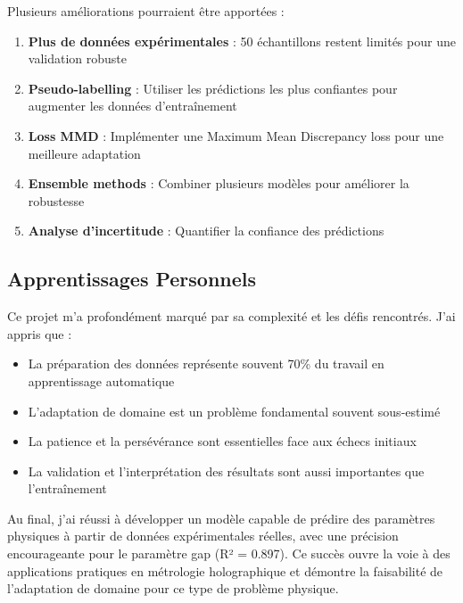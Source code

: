 \documentclass[11pt,a4paper]{article}
\begin{document}
Plusieurs améliorations pourraient être apportées :

\begin{enumerate}
    \item \textbf{Plus de données expérimentales} : 50 échantillons restent limités pour une validation robuste
    \item \textbf{Pseudo-labelling} : Utiliser les prédictions les plus confiantes pour augmenter les données d'entraînement
    \item \textbf{Loss MMD} : Implémenter une Maximum Mean Discrepancy loss pour une meilleure adaptation
    \item \textbf{Ensemble methods} : Combiner plusieurs modèles pour améliorer la robustesse
    \item \textbf{Analyse d'incertitude} : Quantifier la confiance des prédictions
\end{enumerate}

\subsection{Apprentissages Personnels}

Ce projet m'a profondément marqué par sa complexité et les défis rencontrés. J'ai appris que :

\begin{itemize}
    \item La préparation des données représente souvent 70\% du travail en apprentissage automatique
    \item L'adaptation de domaine est un problème fondamental souvent sous-estimé
    \item La patience et la persévérance sont essentielles face aux échecs initiaux
    \item La validation et l'interprétation des résultats sont aussi importantes que l'entraînement
\end{itemize}

Au final, j'ai réussi à développer un modèle capable de prédire des paramètres physiques à partir de données expérimentales réelles, avec une précision encourageante pour le paramètre gap (R² = 0.897). Ce succès ouvre la voie à des applications pratiques en métrologie holographique et démontre la faisabilité de l'adaptation de domaine pour ce type de problème physique.
\end{document}
